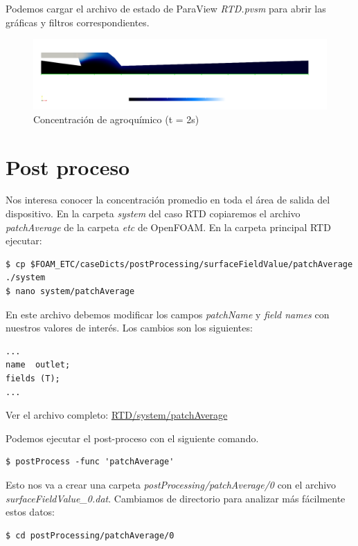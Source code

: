 \documentclass{article}
\begin{document}
Podemos cargar el archivo de estado de ParaView \textit{RTD.pvsm} para abrir las gráficas y filtros correspondientes.

\begin{figure}[h!]
	\centering
	\includegraphics[width=1\textwidth]{Figuras/campo_T.png}
	\caption{Concentración de agroquímico (t = 2s)}
	\label{fig:campo_t}
\end{figure}

\newpage
\section{Post proceso}
Nos interesa conocer la concentración promedio en toda el área de salida del dispositivo. En la carpeta \textit{system} del caso RTD copiaremos el archivo \textit{patchAverage} de la carpeta \textit{etc} de OpenFOAM. En la carpeta principal RTD ejecutar:

\begin{lstlisting}
$ cp $FOAM_ETC/caseDicts/postProcessing/surfaceFieldValue/patchAverage ./system
$ nano system/patchAverage
\end{lstlisting}

En este archivo debemos modificar los campos \textit{patchName} y \textit{field names} con nuestros valores de interés. Los cambios son los siguientes:
\begin{lstlisting}
...
name  outlet;
fields (T);
...
\end{lstlisting}

\noindent Ver el archivo completo: 
\href{https://github.com/guillerolle/casos_cfd/blob/master/01/RTD/system/patchAverage}{RTD/system/patchAverage}
\bigskip

%

Podemos ejecutar el post-proceso con el siguiente comando.

\begin{lstlisting}
$ postProcess -func 'patchAverage'
\end{lstlisting}

Esto nos va a crear una carpeta \textit{postProcessing/patchAverage/0} con el archivo \textit{surfaceFieldValue\_0.dat}. Cambiamos de directorio para analizar más fácilmente estos datos:
\begin{lstlisting}
$ cd postProcessing/patchAverage/0
\end{lstlisting}
\end{document}
